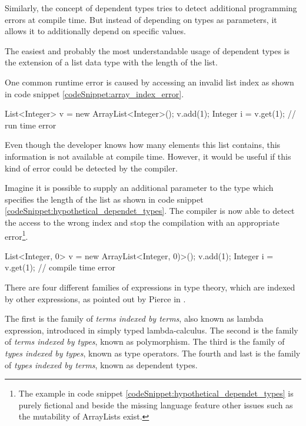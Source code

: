 Similarly, the concept of dependent types tries to detect additional programming errors at compile time.
But instead of depending on types as parameters, it allows it to additionally depend on specific values. 

The easiest and probably the most understandable usage of dependent types is the extension of a list data type with the length of the list. 

One common runtime error is caused by accessing an invalid list index as shown in code snippet \ref{codeSnippet:array_index_error}.

\begin{codesnippet}[caption={ArrayList index error}, label={codeSnippet:array_index_error}]
List<Integer> v = new ArrayList<Integer>();
v.add(1);
Integer i = v.get(1); // run time error
\end{codesnippet}

Even though the developer knows how many elements this list contains, this information is not available at compile time. 
However, it would be useful if this kind of error could be detected by the compiler.

Imagine it is possible to supply an additional parameter to the type which specifies the length of the list as shown in code snippet \ref{codeSnippet:hypothetical_dependet_types}. 
The compiler is now able to detect the access to the wrong index and stop the compilation with an appropriate error\footnote{The example in code snippet \ref{codeSnippet:hypothetical_dependet_types} is purely fictional and beside the missing language feature other issues such as the mutability of ArrayLists exist.}.
\begin{adjustbox}{width=\columnwidth}
\begin{codesnippet}[escapeinside={(*}{*)}, caption={ArrayList with size parameter}, label={codeSnippet:hypothetical_dependet_types}]
List<Integer, 0> v = new ArrayList<Integer, 0)>();
v.add(1);
Integer i = v.get(1); // compile time error
\end{codesnippet}
\end{adjustbox}
\linebreak

There are four different families of expressions in type theory, which are indexed by other expressions, as pointed out by Pierce in \cite{10.5555/1076265}. 

The first is the family of \emph{terms indexed by terms}, also known as lambda expression, introduced in simply typed lambda-calculus. 
The second is the family of \emph{terms indexed by types}, known as polymorphism. 
The third is the family of \emph{types indexed by types}, known as type operators.
The fourth and last is the family of \emph{types indexed by terms}, known as dependent types.


